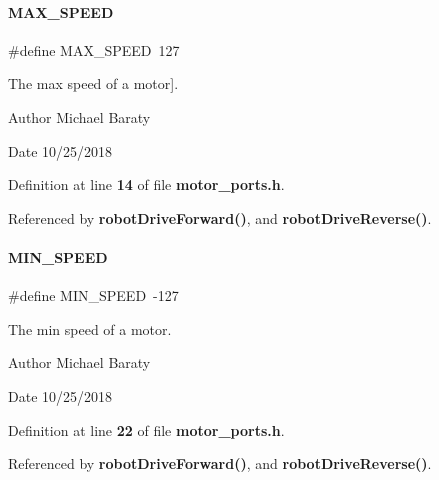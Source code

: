 \paragraph{M\+A\+X\+\_\+\+S\+P\+E\+ED}
{\footnotesize\ttfamily \#define M\+A\+X\+\_\+\+S\+P\+E\+ED~127}



The max speed of a motor]. 

\begin{DoxyAuthor}{Author}
Michael Baraty 
\end{DoxyAuthor}
\begin{DoxyDate}{Date}
10/25/2018 
\end{DoxyDate}


Definition at line \textbf{ 14} of file \textbf{ motor\+\_\+ports.\+h}.



Referenced by \textbf{ robot\+Drive\+Forward()}, and \textbf{ robot\+Drive\+Reverse()}.

\mbox{\label{motor__ports_8h_ad5f5efaa5cb771bd06da4bfe6046809e}} 
\paragraph{M\+I\+N\+\_\+\+S\+P\+E\+ED}
{\footnotesize\ttfamily \#define M\+I\+N\+\_\+\+S\+P\+E\+ED~-\/127}



The min speed of a motor. 

\begin{DoxyAuthor}{Author}
Michael Baraty 
\end{DoxyAuthor}
\begin{DoxyDate}{Date}
10/25/2018 
\end{DoxyDate}


Definition at line \textbf{ 22} of file \textbf{ motor\+\_\+ports.\+h}.



Referenced by \textbf{ robot\+Drive\+Forward()}, and \textbf{ robot\+Drive\+Reverse()}.

\mbox{\label{motor__ports_8h_a36e9fda07b5cd4408170fe907b75a8b7}} 

